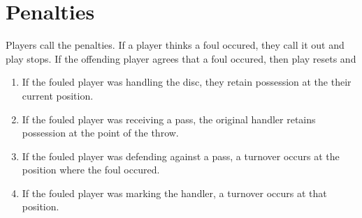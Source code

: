 \documentclass[10pt]{article}
\begin{document}
\section{Penalties}

Players call the penalties. If a player thinks a foul occured, they call it out and play stops. If the offending player agrees that a foul occured, then play resets and
\begin{enumerate}
    \item If the fouled player was handling the disc, they retain possession at the their current position.
    \item If the fouled player was receiving a pass, the original handler retains possession at the point of the throw.
    \item If the fouled player was defending against a pass, a turnover occurs at the position where the foul occured.
    \item If the fouled player was marking the handler, a turnover occurs at that position.
\end{enumerate}
\end{document}
